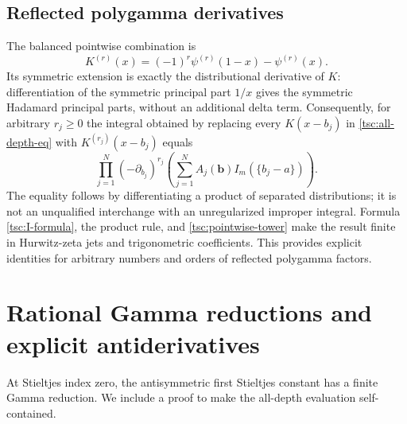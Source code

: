 \documentclass[11pt]{article}
\numberwithin{equation}{section}
\theoremstyle{definition}\newtheorem{definition}[theorem]{Definition}
\theoremstyle{remark}\newtheorem{remark}[theorem]{Remark}
\begin{document}
\subsection{Reflected polygamma derivatives}
The balanced pointwise combination is
\begin{equation}\label{tsc:reflected-poly}
 K^{(r)}(x)=(-1)^r\psi^{(r)}(1-x)-\psi^{(r)}(x).
\end{equation}
Its symmetric extension is exactly the distributional derivative of $K$:
differentiation of the symmetric principal part $1/x$ gives the symmetric
Hadamard principal parts, without an additional delta term. Consequently,
for arbitrary $r_j\ge0$ the integral obtained by replacing every
$K(x-b_j)$ in \eqref{tsc:all-depth-eq} with $K^{(r_j)}(x-b_j)$ equals
\begin{equation}\label{tsc:reflected-derivatives}
 \prod_{j=1}^N(-\partial_{b_j})^{r_j}
           \left(\sum_{j=1}^NA_j(\mathbf b)I_m(\{b_j-a\})\right).
\end{equation}
The equality follows by differentiating a product of separated distributions;
it is not an unqualified interchange with an unregularized improper integral.
Formula \eqref{tsc:I-formula}, the product rule, and
\eqref{tsc:pointwise-tower} make the result finite in Hurwitz-zeta jets and
trigonometric coefficients. This provides explicit identities for arbitrary
numbers and orders of reflected polygamma factors.


\section{Rational Gamma reductions and explicit antiderivatives}\label{tsc:gamma}
At Stieltjes index zero, the antisymmetric first Stieltjes constant has a
finite Gamma reduction. We include a proof to make the all-depth evaluation
self-contained.
\end{document}
